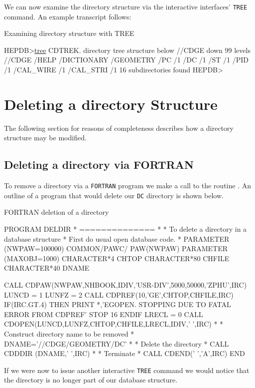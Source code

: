 \par
We can now examine the directory structure via the interactive interfaces'
{\tt TREE} command. An example transcript follows:
%
\begin{XMPt}{Examining directory structure with TREE}

 HEPDB>\underline{tree}
 CDTREK. directory tree structure below //CDGE down          99  levels
 //CDGE
       /HELP
       /DICTIONARY
       /GEOMETRY
                /PC
                    /1
                /DC
                    /1
                /ST
                    /1
                /PID
                    /1
                /CAL_WIRE
                         /1
                /CAL_STRI
                         /1
          16  subdirectories found
HEPDB>

\end{XMPt}
%
%
%
\section{Deleting a directory Structure}
The following section for reasons of completeness describes how a directory structure may
be modified.
%
%
%
\subsection{Deleting a directory via FORTRAN}
To remove a directory via a {\tt FORTRAN} program we make a call
to the routine . An outline of a program
that would delete our {\tt DC} directory is shown below.
%
\begin{XMPt}{FORTRAN deletion of a directory}

      PROGRAM DELDIR
*     ==============
*
*     To delete a directory in a database structure
*     First do usual open database code.
*
      PARAMETER    (NWPAW=100000)
      COMMON/PAWC/ PAW(NWPAW)
      PARAMETER    (MAXOBJ=1000)
      CHARACTER*4  CHTOP
      CHARACTER*80 CHFILE
      CHARACTER*40 DNAME

      CALL CDPAW(NWPAW,NHBOOK,IDIV,'USR-DIV',5000,50000,'ZPHU',IRC)
      LUNCD  = 1
      LUNFZ  = 2
      CALL CDPREF(10,'GE',CHTOP,CHFILE,IRC)
      IF(IRC.GT.4) THEN
         PRINT *,'EGOPEN. STOPPING DUE TO FATAL ERROR FROM CDPREF'
         STOP 16
      ENDIF
      LRECL  = 0
      CALL CDOPEN(LUNCD,LUNFZ,CHTOP,CHFILE,LRECL,IDIV,' ',IRC)
*
*     Construct directory name to be removed
*
      DNAME='//CDGE/GEOMETRY/DC'
*
*     Delete the directory
*
      CALL CDDDIR (DNAME,' ',IRC)
*
*     Terminate
*
      CALL CDEND(' ','A',IRC)
      END

\end{XMPt}
If we were now to issue another interactive {\tt TREE} command we would
notice that the directory is no longer part of our database structure.
%
%
%
